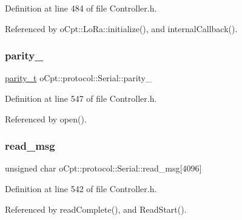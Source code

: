 Definition at line 484 of file Controller.\+h.



Referenced by o\+Cpt\+::\+Lo\+Ra\+::initialize(), and internal\+Callback().

\hypertarget{classo_cpt_1_1protocol_1_1_serial_a2b7e174e85959fcb20bb9cb26fecafc1}{}\label{classo_cpt_1_1protocol_1_1_serial_a2b7e174e85959fcb20bb9cb26fecafc1} 
\subsubsection{\texorpdfstring{parity\+\_\+}{parity\_}}
{\footnotesize\ttfamily \hyperlink{classo_cpt_1_1protocol_1_1_serial_aae21a39fe2f321475ca19d46bf40d5f3}{parity\+\_\+t} o\+Cpt\+::protocol\+::\+Serial\+::parity\+\_\+\hspace{0.3cm}{\ttfamily [protected]}}



Definition at line 547 of file Controller.\+h.



Referenced by open().

\hypertarget{classo_cpt_1_1protocol_1_1_serial_ac8f897b596772bb6923dfcdf0817bc8b}{}\label{classo_cpt_1_1protocol_1_1_serial_ac8f897b596772bb6923dfcdf0817bc8b} 
\subsubsection{\texorpdfstring{read\+\_\+msg}{read\_msg}}
{\footnotesize\ttfamily unsigned char o\+Cpt\+::protocol\+::\+Serial\+::read\+\_\+msg\mbox{[}4096\mbox{]}\hspace{0.3cm}{\ttfamily [protected]}}



Definition at line 542 of file Controller.\+h.



Referenced by read\+Complete(), and Read\+Start().

\hypertarget{classo_cpt_1_1protocol_1_1_serial_a9a442122381d39a30c4d4b231e17752e}{}\label{classo_cpt_1_1protocol_1_1_serial_a9a442122381d39a30c4d4b231e17752e} 
